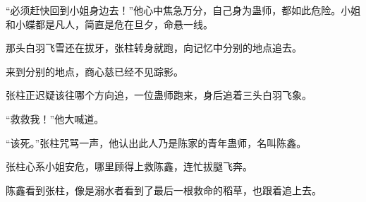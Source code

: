 \begin{this_body}
“必须赶快回到小姐身边去！”他心中焦急万分，自己身为蛊师，都如此危险。小姐和小蝶都是凡人，简直是危在旦夕，命悬一线。

那头白羽飞雪还在拔牙，张柱转身就跑，向记忆中分别的地点追去。

来到分别的地点，商心慈已经不见踪影。

张柱正迟疑该往哪个方向追，一位蛊师跑来，身后追着三头白羽飞象。

“救救我！”他大喊道。

“该死。”张柱咒骂一声，他认出此人乃是陈家的青年蛊师，名叫陈鑫。

张柱心系小姐安危，哪里顾得上救陈鑫，连忙拔腿飞奔。

陈鑫看到张柱，像是溺水者看到了最后一根救命的稻草，也跟着追上去。

\end{this_body}

